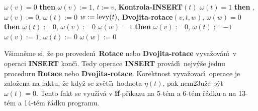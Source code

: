 \phantom{---}{\bf else}\newline 
\phantom{------}{\bf if} $\omega (v)=0$ {\bf then}\newline 
\phantom{---------}$\omega (v):=1$, $t:=v$, {\bf Kontrola-INSERT}$(t)$\newline 
\phantom{------}{\bf else}\newline 
\phantom{---------}{\bf if} $\omega (t)=1$ {\bf then}\newline 
\phantom{------------}{\bf Rotace$(v,t)$}, $\omega (v):=0$, $\omega (t):=0$\newline 
\phantom{---------}{\bf else}\newline 
\phantom{------------}$w:=\operatorname{levy}(t)$, {\bf Dvojita-rotace$(v,t,w)$},\newline 
\phantom{------------}{\bf if} $\omega (w)=0$ {\bf then}\newline 
\phantom{---------------}$\omega (t):=0$, $\omega (v):=0$\newline 
\phantom{------------}{\bf else}\newline 
\phantom{---------------}{\bf if} $\omega (w)=1$ {\bf then}\newline 
\phantom{------------------}$\omega (v):=0$, $\omega(t):=-1$\newline 
\phantom{---------------}{\bf else}\newline 
\phantom{------------------}$\omega (v):=1$, $\omega (t):=0$\newline 
\phantom{---------------}{\bf endif}\newline 
\phantom{------------}{\bf endif}\newline 
\phantom{------------}$\omega (w):=0$\newline 
\phantom{---------}{\bf endif}\newline 
\phantom{------}{\bf endif}\newline 
\phantom{---}{\bf endif\newline 
endif}
\bigskip

\flushpar V\v simn\v eme si, \v ze po proveden\'\i\ {\bf Rotace} nebo
{\bf Dvojita-rotace} vyva\v zov\'an\'\i\ v operaci {\bf INSERT} kon\v c\'\i . Tedy 
operace {\bf INSERT} prov\'ad\'\i\ nejv\'y\v se jednu proceduru {\bf Rotace }
nebo {\bf Dvojita-rota\-ce}. Korektnost vyva\v zovac\'\i\ operace je 
zalo\v zena na faktu, \v ze kdy\v z se zv\v et\v s\'\i\ hodnota $
\eta (t)$, pak 
nem\accent23u\v ze b\'yt $\omega (t)=0$. Tento fakt se vyu\v z\'\i v\'a  v 
{\bf if}-p\v r\'\i kazu na 5-t\'em a 6-t\'em \v r\'adku a na 13-t\'em a 14-t\'em  
\v r\'adku programu.
\medskip

